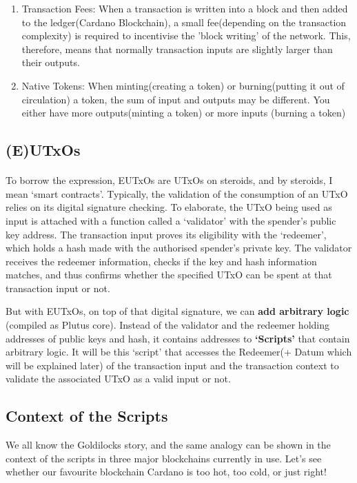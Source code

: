 \documentclass[a4paper, 11pt]{article}
\begin{document}
    \begin{enumerate}
        \item Transaction Fees: When a transaction is written into a block and then added to the ledger(Cardano Blockchain), a small fee(depending on the transaction complexity) is required to incentivise the 'block writing' of the network. This, therefore, means that normally transaction inputs are slightly larger than their outputs.
        \item Native Tokens: When minting(creating a token) or burning(putting it out of circulation) a token, the sum of input and outputs may be different. You either have more outputs(minting a token) or more inputs (burning a token)
    \end{enumerate}

    \subsection{(E)UTxOs}

    \paragraph{} To borrow the expression, EUTxOs are UTxOs on steroids, and by steroids, I mean `smart contracts'. Typically, the validation of the consumption of an UTxO relies on its digital signature checking. To elaborate, the UTxO being used as input is attached with a function called a `validator' with the spender's public key address. The transaction input proves its eligibility with the `redeemer', which holds a hash made with the authorised spender's private key. The validator receives the redeemer information, checks if the key and hash information matches, and thus confirms whether the specified UTxO can be spent at that transaction input or not.
    
    But with EUTxOs, on top of that digital signature, we can \textbf{add arbitrary logic} (compiled as Plutus core). Instead of the validator and the redeemer holding addresses of public keys and hash, it contains addresses to \textbf{`Scripts'} that contain arbitrary logic. It will be this  `script' that accesses the Redeemer(+ Datum which will be explained later) of the transaction input and the transaction context to validate the associated UTxO as a valid input or not. 

    \subsection{Context of the Scripts}
    We all know the Goldilocks story, and the same analogy can be shown in the context of the scripts in three major blockchains currently in use. Let's see whether our favourite blockchain Cardano is too hot, too cold, or just right!
\end{document}
